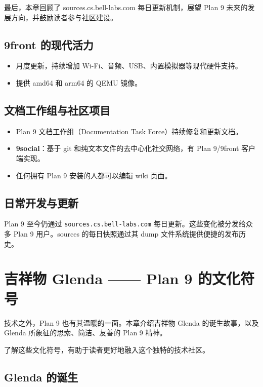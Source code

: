 \documentclass[12pt,UTF8]{ctexbook}
\begin{document}
最后，本章回顾了 sources.cs.bell-labs.com 每日更新机制，展望 Plan 9 未来的发展方向，并鼓励读者参与社区建设。

\section{9front 的现代活力}

\begin{itemize}
\item 月度更新，持续增加 Wi-Fi、音频、USB、内置模拟器等现代硬件支持。
\item 提供 amd64 和 arm64 的 QEMU 镜像。
\end{itemize}

\section{文档工作组与社区项目}

\begin{itemize}
\item Plan 9 文档工作组（Documentation Task Force）持续修复和更新文档。
\item \textbf{9social}：基于 git 和纯文本文件的去中心化社交网络，有 Plan 9/9front 客户端实现。
\item 任何拥有 Plan 9 安装的人都可以编辑 wiki 页面。
\end{itemize}

\section{日常开发与更新}

Plan 9 至今仍通过 \texttt{sources.cs.bell-labs.com} 每日更新。这些变化被分发给众多 Plan 9 用户。sources 的每日快照通过其 dump 文件系统提供便捷的发布历史。

\chapter{吉祥物 Glenda —— Plan 9 的文化符号}

技术之外，Plan 9 也有其温暖的一面。本章介绍吉祥物 Glenda 的诞生故事，以及 Glenda 所象征的思索、简洁、友善的 Plan 9 精神。

了解这些文化符号，有助于读者更好地融入这个独特的技术社区。

\section{Glenda 的诞生}
\end{document}
